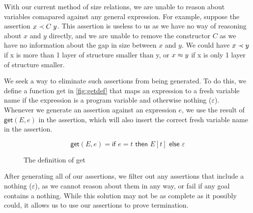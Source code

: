 With our current method of size relations, we are unable to reason about variables
comapared against any general expression. For example, suppose the assertion $x \prec C\; y$.
This assertion is useless to us as we have no way of reasoning about $x$ and $y$ directly,
and we are unable to remove the constructor $C$ as we have no information about the
gap in size between $x$ and $y$. We could have $x \prec y$ if x is more than 1 layer
of structure smaller than y, or $x \approx y$ if x is only 1 layer of structure smaller.

We seek a way to eliminate such assertions from being generated. To do this,
we define a function \textsf{get} in \autoref{fig:getdef} that maps an expression to
a fresh variable name if the expression is a program variable and otherwise nothing 
($\varepsilon$).
Whenever we generate an assertion against an expression $e$, we use the result
of $\textsf{get}(E,e)$ in the assertion, which will also insert the correct fresh
variable name in the assertion.


\begin{figure}
    \centering
    \[
        \textsf{get}(E, e) = \textsf{if } e = t \textsf{ then } E[t] \textsf{ else } \varepsilon
    \]
    
    \caption{The definition of \textsf{get}}
    \label{fig:getdef}
\end{figure}

After generating all of our assertions, we filter out any assertions that include a nothing ($\varepsilon$),
as we cannot reason about them in any way, or fail if any goal contains a nothing. While this solution may
not be as complete as it possibly could, it allows us to use our assertions to prove termination.

\FloatBarrier

